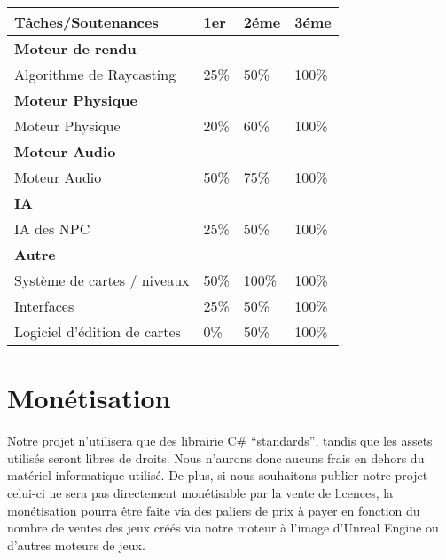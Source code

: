 \documentclass[french, 12pt]{article}
\begin{document}
    \begin{table}[!htb]
        \begin{tabular}{|l|l|l|l|}
            \hline
            
            \textbf{Tâches/Soutenances} & \textbf{1er} & \textbf{2éme} & \textbf{3éme} \\ \hline
            
            \multicolumn{4}{|l|}{\textbf{Moteur de rendu}} \\ \hline
            Algorithme de Raycasting & 25\% & 50\% & 100\% \\ \hline

            \multicolumn{4}{|l|}{\textbf{Moteur Physique}} \\ \hline
            Moteur Physique & 20\% & 60\% & 100\% \\ \hline

            \multicolumn{4}{|l|}{\textbf{Moteur Audio}} \\ \hline
            Moteur Audio & 50\% & 75\% & 100\% \\ \hline

            \multicolumn{4}{|l|}{\textbf{IA}} \\ \hline
            IA des NPC & 25\% & 50\% & 100\% \\ \hline

            \multicolumn{4}{|l|}{\textbf{Autre}} \\ \hline
            Système de cartes / niveaux & 50\% & 100\% & 100\% \\ \hline
            Interfaces & 25\% & 50\% & 100\% \\ \hline
            Logiciel d'édition de cartes & 0\% & 50\% & 100\% \\ \hline
            
        \end{tabular}
    \end{table}

    \newpage

    \Huge
    \color{black}
    \section{Monétisation}

    \normalsize

    Notre projet n’utilisera que des librairie C\# “standards”, tandis que les assets utilisés seront libres de droits. Nous n’aurons donc aucuns frais en dehors du matériel informatique utilisé. De plus, si nous souhaitons publier notre projet celui-ci ne sera pas directement monétisable par la vente de licences, la monétisation pourra être faite via des paliers de prix à payer en fonction du nombre de ventes des jeux créés via notre moteur à l’image d’Unreal Engine ou d’autres moteurs de jeux. 
    
\end{document}
